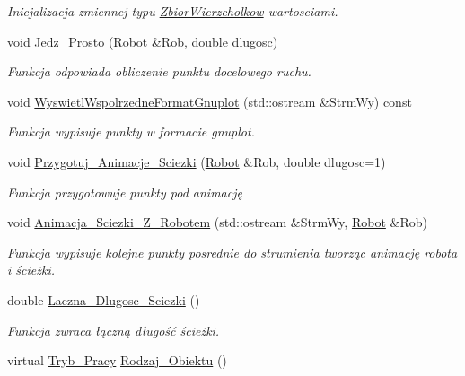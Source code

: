 \begin{DoxyCompactItemize}
\begin{DoxyCompactList}\small\item\em Inicjalizacja zmiennej typu \hyperlink{class_zbior_wierzcholkow}{Zbior\+Wierzcholkow} wartosciami. \end{DoxyCompactList}\item 
void \hyperlink{class_sciezka_a37541491882dcd2e327f58207f376bd2}{Jedz\+\_\+\+Prosto} (\hyperlink{class_robot}{Robot} \&Rob, double dlugosc)
\begin{DoxyCompactList}\small\item\em Funkcja odpowiada obliczenie punktu docelowego ruchu. \end{DoxyCompactList}\item 
void \hyperlink{class_sciezka_a9fc6b8104ec42ffd5146fe4ca8ddd1ac}{Wyswietl\+Wspolrzedne\+Format\+Gnuplot} (std\+::ostream \&Strm\+Wy) const 
\begin{DoxyCompactList}\small\item\em Funkcja wypisuje punkty w formacie gnuplot. \end{DoxyCompactList}\item 
void \hyperlink{class_sciezka_a7d748699e2bf7940d76361b66b4fedba}{Przygotuj\+\_\+\+Animacje\+\_\+\+Sciezki} (\hyperlink{class_robot}{Robot} \&Rob, double dlugosc=1)
\begin{DoxyCompactList}\small\item\em Funkcja przygotowuje punkty pod animację \end{DoxyCompactList}\item 
void \hyperlink{class_sciezka_af673870927f8b8e88b1e31b8bb018de3}{Animacja\+\_\+\+Sciezki\+\_\+\+Z\+\_\+\+Robotem} (std\+::ostream \&Strm\+Wy, \hyperlink{class_robot}{Robot} \&Rob)
\begin{DoxyCompactList}\small\item\em Funkcja wypisuje kolejne punkty posrednie do strumienia tworząc animację robota i ścieżki. \end{DoxyCompactList}\item 
\hypertarget{class_sciezka_a3129be908dfd809c4c9339605e21e775}{double \hyperlink{class_sciezka_a3129be908dfd809c4c9339605e21e775}{Laczna\+\_\+\+Dlugosc\+\_\+\+Sciezki} ()}\label{class_sciezka_a3129be908dfd809c4c9339605e21e775}

\begin{DoxyCompactList}\small\item\em Funkcja zwraca łączną długość ścieżki. \end{DoxyCompactList}\item 
\hypertarget{class_sciezka_a33b98a64c04fbec4ed0e3509ef109b71}{virtual \hyperlink{_objekt___graficzny_8hh_a59b4a471a7481f2a0551d90a8a745c9f}{Tryb\+\_\+\+Pracy} \hyperlink{class_sciezka_a33b98a64c04fbec4ed0e3509ef109b71}{Rodzaj\+\_\+\+Obiektu} ()}\label{class_sciezka_a33b98a64c04fbec4ed0e3509ef109b71}


\end{DoxyCompactItemize}
